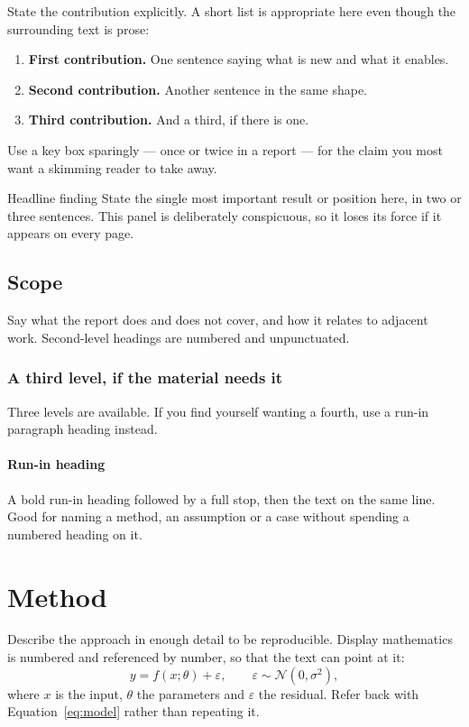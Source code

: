 \documentclass{daimreport}
\begin{document}
State the contribution explicitly. A short list is appropriate here even though
the surrounding text is prose:

\begin{enumerate}
  \item \textbf{First contribution.} One sentence saying what is new and what it
        enables.
  \item \textbf{Second contribution.} Another sentence in the same shape.
  \item \textbf{Third contribution.} And a third, if there is one.
\end{enumerate}

Use a key box sparingly --- once or twice in a report --- for the claim you most
want a skimming reader to take away.

\begin{daimkeybox}{Headline finding}
State the single most important result or position here, in two or three
sentences. This panel is deliberately conspicuous, so it loses its force if it
appears on every page.
\end{daimkeybox}

\subsection{Scope}

Say what the report does and does not cover, and how it relates to adjacent
work. Second-level headings are numbered and unpunctuated.

\subsubsection{A third level, if the material needs it}

Three levels are available. If you find yourself wanting a fourth, use a run-in
paragraph heading instead.

\paragraph{Run-in heading} A bold run-in heading followed by a full stop, then
the text on the same line. Good for naming a method, an assumption or a case
without spending a numbered heading on it.

\section{Method}

Describe the approach in enough detail to be reproducible. Display mathematics
is numbered and referenced by number, so that the text can point at it:
\begin{equation}
  y = f(x; \theta) + \varepsilon,
  \qquad \varepsilon \sim \mathcal{N}(0, \sigma^2),
  \label{eq:model}
\end{equation}
where $x$ is the input, $\theta$ the parameters and $\varepsilon$ the residual.
Refer back with Equation~\eqref{eq:model} rather than repeating it.
\end{document}
